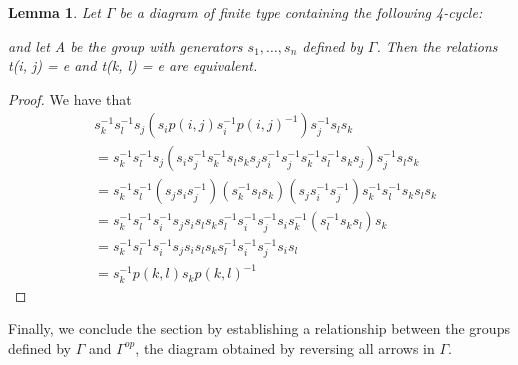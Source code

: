 \documentclass[11pt]{amsart}
\newtheorem{lem}[thm]{Lemma}
\theoremstyle{definition}
\begin{document}
\begin{lem} \label{2sqr}
Let $\Gamma$ be a diagram of finite type containing the following 4-cycle:
and let A be the group with generators $s_{1}, \dots, s_{n}$ defined by $\Gamma$. Then the relations t(i, j) = e and t(k, l) = e are equivalent.
\end{lem}

\begin{proof}
We have that
\begin{align*}
& s_{k}^{-1}s_{l}^{-1}s_{j}(s_{i}p(i, j)s_{i}^{-1}p(i, j)^{-1})s_{j}^{-1}s_{l}s_{k} \\
&= s_{k}^{-1}s_{l}^{-1}s_{j}(s_{i}s_{j}^{-1}s_{k}^{-1}s_{l}s_{k}s_{j}s_{i}^{-1}s_{j}^{-1}s_{k}^{-1}s_{l}^{-1}s_{k}s_{j})s_{j}^{-1}s_{l}s_{k} \\
&= s_{k}^{-1}s_{l}^{-1}(s_{j}s_{i}s_{j}^{-1})(s_{k}^{-1}s_{l}s_{k})(s_{j}s_{i}^{-1}s_{j}^{-1})s_{k}^{-1}s_{l}^{-1}s_{k}s_{l}s_{k} \\
&= s_{k}^{-1}s_{l}^{-1}s_{i}^{-1}s_{j}s_{i}s_{l}s_{k}s_{l}^{-1}s_{i}^{-1}s_{j}^{-1}s_{i}s_{k}^{-1}(s_{l}^{-1}s_{k}s_{l})s_{k} \\
&= s_{k}^{-1}s_{l}^{-1}s_{i}^{-1}s_{j}s_{i}s_{l}s_{k}s_{l}^{-1}s_{i}^{-1}s_{j}^{-1}s_{i}s_{l} \\
&= s_{k}^{-1}p(k, l)s_{k}p(k, l)^{-1}
\end{align*}
\end{proof}

Finally, we conclude the section by establishing a relationship between the groups defined by $\Gamma$ and $\Gamma^{op}$, the diagram obtained by reversing all arrows in $\Gamma$.
\end{document}
